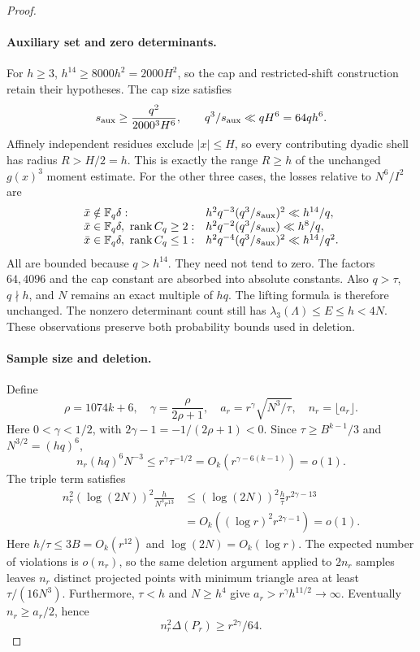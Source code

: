 \documentclass[11pt]{article}
\begin{document}
\begin{proof}
\paragraph{Auxiliary set and zero determinants.}
For \(h\ge3\), \(h^{14}\ge8000h^2=2000H^2\), so the cap and
restricted-shift construction retain their hypotheses.
The cap size satisfies
\[
 s_{\rm aux}\ge\frac{q^2}{2000^3H^6},\qquad
 q^3/s_{\rm aux}\ll qH^6=64qh^6.
\]
Affinely independent residues exclude \(|x|\le H\), so every contributing
dyadic shell has radius \(R>H/2=h\). This is exactly the range
\(R\ge h\) of the unchanged \(g(x)^3\) moment estimate.
For the other three cases, the losses relative to \(N^6/I^2\) are
\[
\begin{array}{ll}
 \bar x\notin{\mathbb F}_q\delta:
   & h^2q^{-3}(q^3/s_{\rm aux})^2\ll h^{14}/q,\\
 \bar x\in{\mathbb F}_q\delta,\ \operatorname{rank}C_q\ge2:
   & h^2q^{-2}(q^3/s_{\rm aux})\ll h^8/q,\\
 \bar x\in{\mathbb F}_q\delta,\ \operatorname{rank}C_q\le1:
   & h^2q^{-4}(q^3/s_{\rm aux})^2\ll h^{14}/q^2.
\end{array}
\]
All are bounded because \(q>h^{14}\). They need not tend to zero.
The factors \(64,4096\) and the cap constant are absorbed into
absolute constants.
Also \(q>\tau\), \(q\nmid h\), and \(N\) remains an exact multiple
of \(hq\). The lifting formula is therefore unchanged.
The nonzero determinant count still has
\(\lambda_3(\Lambda)\le E\le h<4N\).
These observations preserve both probability bounds used in deletion.

\paragraph{Sample size and deletion.}
Define
\[
 \rho=1074k+6,\quad
 \gamma=\frac{\rho}{2\rho+1},\quad
 a_r=r^\gamma\sqrt{N^3/\tau},\quad n_r=\lfloor a_r\rfloor .
\]
Here \(0<\gamma<1/2\), with
\(2\gamma-1=-1/(2\rho+1)<0\).
Since \(\tau\ge B^{k-1}/3\) and \(N^{3/2}=(hq)^6\),
\[
 n_r(hq)^6N^{-3}
 \le r^\gamma\tau^{-1/2}
 =O_k(r^{\gamma-6(k-1)})=o(1).
\]
The triple term satisfies
\[
\begin{aligned}
 n_r^2(\log(2N))^2\frac{h}{N^3r^{13}}
 &\le(\log(2N))^2\frac{h}{\tau}r^{2\gamma-13}\\
 &=O_k((\log r)^2r^{2\gamma-1})=o(1).
\end{aligned}
\]
Here \(h/\tau\le3B=O_k(r^{12})\) and \(\log(2N)=O_k(\log r)\).
The expected number of violations is \(o(n_r)\), so the same deletion
argument applied to \(2n_r\) samples leaves \(n_r\) distinct projected
points with minimum triangle area at least \(\tau/(16N^3)\).
Furthermore, \(\tau<h\) and \(N\ge h^4\) give
\(a_r>r^\gamma h^{11/2}\to\infty\). Eventually \(n_r\ge a_r/2\), hence
\[
 n_r^2\Delta(P_r)\ge r^{2\gamma}/64.
\]


\end{proof}
\end{document}
